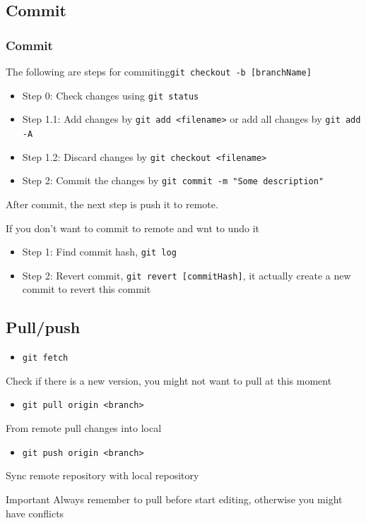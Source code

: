 \documentclass{beamer}
\begin{document}
		\subsection{Commit}
			\begin{frame}
				\frametitle{Commit}
				The following are steps for commiting\texttt{git checkout -b [branchName]}
				\begin{itemize}
					\item Step 0: Check changes using \texttt{git status}
					\item Step 1.1: Add changes by \texttt{git add <filename>} or add all changes by \texttt{git add -A}
					\item Step 1.2: Discard changes by \texttt{git checkout <filename>}
					\item Step 2: Commit the changes by \texttt{git commit -m "Some description"}
				\end{itemize}
				After commit, the next step is push it to remote.

				If you don't want to commit to remote and wnt to undo it
				\begin{itemize}
					\item Step 1: Find commit hash, \texttt{git log}
					\item Step 2: Revert commit, \texttt{git revert [commitHash]}, it actually create a new commit to revert this commit
				\end{itemize}
			\end{frame}

		\subsection{Pull/push}
			\begin{frame}
				\begin{itemize}
					\item \texttt{git fetch}
				\end{itemize}
				Check if there is a new version, you might not want to pull at this moment

				\begin{itemize}
					\item \texttt{git pull origin <branch>}
				\end{itemize}
				From remote pull changes into local

				\begin{itemize}
					\item \texttt{git push origin <branch>}
				\end{itemize}
				Sync remote repository with local repository

				\begin{alertblock}{Important}
					Always remember to pull before start editing, otherwise you might have conflicts
				\end{alertblock}
			\end{frame}
\end{document}
